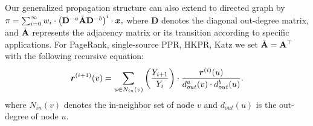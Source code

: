 Our generalized propagation structure can also extend to directed graph by $\pi=\sum_{i=0}^\infty w_i \cdot \left(\mathbf{D}^{-a}\tilde{\mathbf{A}}\mathbf{D}^{-b} \right)^i \cdot \bm{x},$
where $\bm{D}$ denotes the diagonal out-degree matrix, and $\tilde{\mathbf{A}}$ represents the adjacency matrix or its transition according to specific applications. For PageRank, single-source PPR, HKPR, Katz we set $\tilde{\mathbf{A}}=\mathbf{A}^\top$ with the following recursive equation: 
\vspace{-2mm}
\begin{equation}\nonumber
\vspace{-2mm}
	\begin{aligned}
		\vec{r}^{(i+1)}(v)=\sum_{u\in N_{in}(v)} \left(\frac{Y_{i+1}}{Y_i} \right) \cdot \frac{\vec{r}^{(i)}(u)}{d_{out}^{a}(v) \cdot d_{out}^b(u)}. 
	\end{aligned}
\end{equation}
where $N_{in}(v)$ denotes the in-neighbor set of node $v$ and $d_{out}(u)$ is the out-degree of node $u$. 








